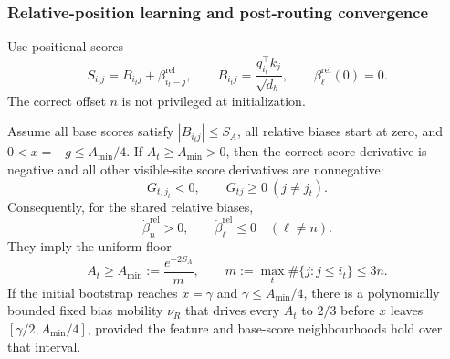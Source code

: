 \subsubsection{Relative-position learning and post-routing convergence}
\label{app:weak-routing-convergence}

Use positional scores
\begin{equation}\label{eq:lr-relative-scores}
 S_{i_tj}=B_{i_tj}+\beta_{i_t-j}^{\mathrm{rel}},
 \qquad
 B_{i_tj}=\frac{q_{i_t}^\top k_j}{\sqrt{d_h}},
 \qquad \beta_\ell^{\mathrm{rel}}(0)=0.
\end{equation}
The correct offset $n$ is not privileged at initialization.

\begin{lrlemma}
\label{lem:lr-bias-learning}
Assume all base scores satisfy $|B_{i_tj}|\le S_A$,
all relative biases start at zero, and
$0<x=-g\le A_{\min}/4$. If $A_t\ge A_{\min}>0$,
then the correct score derivative is negative and all other visible-site
score derivatives are nonnegative:
\begin{equation}\label{eq:lr-smallscore-sign}
 G_{t,j_t}<0,\qquad G_{tj}\ge0\ (j\ne j_t).
\end{equation}
Consequently, for the shared relative biases,
\begin{equation}\label{eq:lr-beta-routes}
 \dot\beta_n^{\mathrm{rel}}>0,\qquad
 \dot\beta_\ell^{\mathrm{rel}}\le0\quad(\ell\ne n).
\end{equation}
They imply the uniform floor
\begin{equation}\label{eq:lr-floor}
 A_t\ge A_{\min}:=\frac{e^{-2S_A}}m,
 \qquad m:=\max_t\#\{j:j\le i_t\}\le3n.
\end{equation}
If the initial bootstrap reaches $x=\gamma$ and
$\gamma\le A_{\min}/4$, there is a polynomially bounded fixed bias
mobility $\nu_R$ that drives every $A_t$ to $2/3$ before $x$ leaves
$[\gamma/2,A_{\min}/4]$, provided the feature and base-score
neighbourhoods hold over that interval.
\end{lrlemma}
